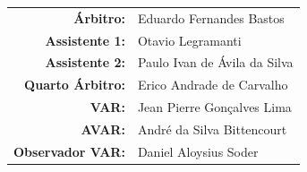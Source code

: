 \documentclass[11pt]{article}
\newcommand{\teamjersey}{}
\begin{document}
\vspace{0.5cm}
\begin{minipage}{0.65\textwidth}
\begin{center}
\begin{tabular}{rl}
\textbf{Árbitro:} & Eduardo Fernandes Bastos \\
\textbf{Assistente 1:} & Otavio Legramanti \\
\textbf{Assistente 2:} & Paulo Ivan de Ávila da Silva \\
\textbf{Quarto Árbitro:} & Erico Andrade de Carvalho \\
\textbf{VAR:} & Jean Pierre Gonçalves Lima \\
\textbf{AVAR:} & André da Silva Bittencourt \\
\textbf{Observador VAR:} & Daniel Aloysius Soder \\
\end{tabular}
\end{center}
\end{minipage}
\begin{minipage}{0.3\textwidth}
\end{minipage}
\newpage
\vspace{0.5cm}
\renewcommand{\teamjersey}{../assets/camisa/costas1.png}
\end{document}
